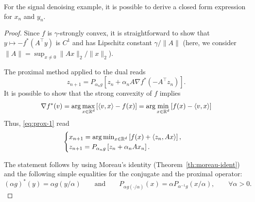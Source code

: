  \begin{remark}
     For the signal denoising example, it is possible to derive a closed form expression for $x_n$ and $y_n$.
 \end{remark}
 
 \begin{proof}
     Since $f$ is $\gamma$-strongly convex, it is straightforward to show that $y\mapsto -f^*(A^\top y)$ is $C^1$ and has Lipschitz constant $\gamma/\|A\|$ (here, we consider $\|A\|=\sup_{x\neq 0} \|Ax\|_2/\|x\|_2$).
 
     The proximal method applied to the dual reads
     \begin{equation}
         \label{eq:prox-1}
         z_{n+1} = P_{\alpha_n g}\left[ z_n + \alpha_n A \nabla f^*(-A^\top z_n) \right].
     \end{equation}
     It is possible to show that the strong convexity of $f$ implies
     \begin{equation}
         \nabla f^* (v) = \arg\max_{x\in\mathbb{R}^d} \left[\langle v,x\rangle - f(x) \right]
         = \arg\min_{x\in\mathbb{R}^d} \left[f(x)-\langle v,x\rangle \right]
     \end{equation}
     Thus, \eqref{eq:prox-1} read
     \begin{equation}
         \begin{cases}
             x_{n+1} =\arg\min_{x\in\mathbb{R}^d} \left[f(x)+\langle z_n,Ax\rangle \right] , \\
             z_{n+1}=P_{\alpha_n g}\left[ z_n + \alpha_n A x_n \right].
         \end{cases}
     \end{equation}
 
     The statement follows by using Moreau's identity (Theorem~\ref{th:moreau-ident}) and the following simple equalities for the conjugate and the proximal operator:
     \begin{equation}
         (\alpha g)^*(y) = \alpha g(y / \alpha)
         \qquad\text{and}\qquad
         P_{\alpha g(\cdot/\alpha)} (x) = \alpha P_{\alpha^{-1}g}(x/\alpha),
         \qquad \forall\alpha>0.
     \end{equation}
 \end{proof}
 